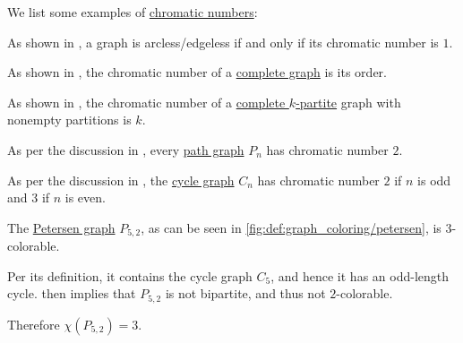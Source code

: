 \begin{example}\label{ex:def:chromatic_number}
  We list some examples of \hyperref[def:chromatic_number]{chromatic numbers}:
  \begin{thmenum}
     As shown in , a graph is arcless/edgeless if and only if its chromatic number is \( 1 \).

     As shown in , the chromatic number of a \hyperref[def:complete_graph]{complete graph} is its order.

     As shown in , the chromatic number of a \hyperref[def:complete_multipartite_graph]{complete \( k \)-partite} graph with nonempty partitions is \( k \).

     As per the discussion in , every \hyperref[def:path_graph]{path graph} \( P_n \) has chromatic number \( 2 \).

     As per the discussion in , the \hyperref[def:cycle_graph]{cycle graph} \( C_n \) has chromatic number \( 2 \) if \( n \) is odd and \( 3 \) if \( n \) is even.

     The \hyperref[def:petersen_graph]{Petersen graph} \( P_{5,2} \), as can be seen in \cref{fig:def:graph_coloring/petersen}, is \( 3 \)-colorable.

    Per its definition, it contains the cycle graph \( C_5 \), and hence it has an odd-length cycle.  then implies that \( P_{5,2} \) is not bipartite, and thus not \( 2 \)-colorable.

    Therefore \( \chi(P_{5,2}) = 3 \).
  \end{thmenum}
\end{example}
